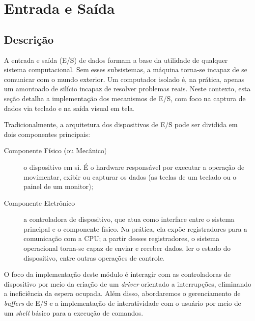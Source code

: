 \chapter{Entrada e Saída}




\section{Descrição}

A entrada e saída (E/S) de dados formam a base da utilidade de qualquer sistema computacional. Sem esses subsistemas, a máquina torna-se incapaz de se comunicar com o mundo exterior. Um computador isolado é, na prática, apenas um amontoado de silício incapaz de resolver problemas reais. Neste contexto, esta seção detalha a implementação dos mecanismos de E/S, com foco na captura de dados via teclado e na saída visual em tela.

Tradicionalmente, a arquitetura dos dispositivos de E/S pode ser dividida em dois componentes principais:

\begin{description}
    \item[Componente Físico (ou Mecânico)] o dispositivo em si. É o hardware responsável por executar a operação de movimentar, exibir ou capturar os dados (as teclas de um teclado ou o painel de um monitor);
    \item[Componente Eletrônico] a controladora de dispositivo, que atua como interface entre o sistema principal e o componente físico. Na prática, ela expõe registradores para a comunicação com a CPU; a partir desses registradores, o sistema operacional torna-se capaz de enviar e receber dados, ler o estado do dispositivo, entre outras operações de controle.
\end{description}

O foco da implementação deste módulo é interagir com as controladoras de dispositivo por meio da criação de um \textit{driver} orientado a interrupções, eliminando a ineficiência da espera ocupada. Além disso, abordaremos o gerenciamento de \textit{buffers} de E/S e a implementação de interatividade com o usuário por meio de um \textit{shell} básico para a execução de comandos.

